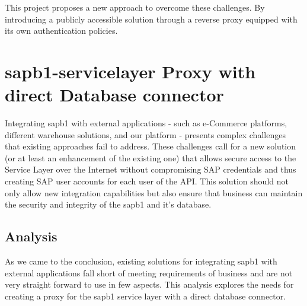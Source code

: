This project proposes a new approach to overcome these challenges.
By introducing a publicly accessible solution through a reverse proxy equipped with its own authentication policies.

\section{\gls{sapb1-servicelayer} Proxy with direct Database connector}
\label{sec:sap-b1-service-layer-proxy}
Integrating \gls{sapb1} with external applications - such as e-Commerce platforms, different warehouse solutions, and our platform - presents complex challenges that existing  approaches fail to address. 
These challenges call for a new solution (or at least an enhancement of the existing one) that allows secure access to the Service Layer over the Internet without compromising SAP credentials and thus creating SAP user accounts for each user of the API.
This solution should not only allow new integration capabilities but also ensure that business can maintain the security and integrity of the \gls{sapb1} and it's database.

\subsection{Analysis}
\label{subsec:analysis}
As we came to the conclusion, existing solutions for integrating \gls{sapb1} with external applications fall short of meeting requirements of business and are not very straight forward to use in few aspects.
This analysis explores the needs for creating a proxy for the \gls{sapb1} service layer with a direct database connector.

